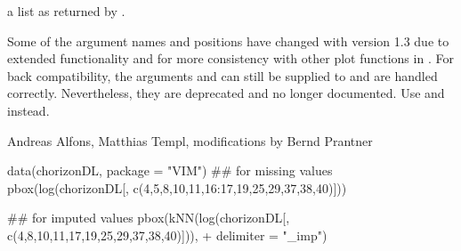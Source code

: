 %
\begin{Value}
a list as returned by .
\end{Value}
%
\begin{Note}\relax
Some of the argument names and positions have changed with version 1.3 
due to extended functionality and for more consistency with other plot 
functions in .  For back compatibility, the arguments 
 and  can still be supplied to  
and are handled correctly.  Nevertheless, they are deprecated and no 
longer documented.  Use  and  instead.
\end{Note}
%
\begin{Author}\relax
Andreas Alfons, Matthias Templ, modifications by Bernd Prantner
\end{Author}
%
\begin{SeeAlso}\relax
{}
\end{SeeAlso}
%
\begin{Examples}
\begin{ExampleCode}
data(chorizonDL, package = "VIM")
## for missing values
pbox(log(chorizonDL[, c(4,5,8,10,11,16:17,19,25,29,37,38,40)]))

## for imputed values
pbox(kNN(log(chorizonDL[, c(4,8,10,11,17,19,25,29,37,38,40)])),
    + delimiter = "_imp")
\end{ExampleCode}
\end{Examples}

